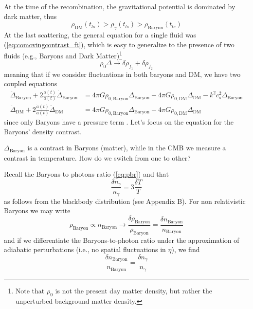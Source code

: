 At the time of the recombination, the gravitational potential is dominated by dark matter, thus
\begin{equation*}
    \rho_{\text{DM}}(t_{ls}) > \rho_{\gamma}(t_{ls}) > \rho_{\text{Baryon}}(t_{ls})
\end{equation*}
At the last scattering, the general equation for a single fluid was (\ref{eq:comovingcontrast_ft}), which is easy to generalize to the presence of two fluids (e.g., Baryons and Dark Matter)\footnote{Note that $\rho_{0}$ is not the present day matter density, but rather the unperturbed background matter density.}
\begin{equation*}
    \rho_{0}\Delta \to \delta\rho_{f_{1}}+\delta\rho_{f_{2}}
\end{equation*}
meaning that if we consider fluctuations in both baryons and DM, we have two coupled equations
\begin{align*}
    \ddot{\Delta}_{\text{Baryon}}+2\frac{\dot{a}(t)}{a(t)}\dot{\Delta}_{\text{Baryon}} &= 4\pi G\rho_{0,\text{Baryon}}\Delta_{\text{Baryon}}+4\pi G\rho_{0,\text{DM}}\Delta_{\text{DM}}-k^{2}c_{s}^{2}\Delta_{\text{Baryon}}\\
    \ddot{\Delta}_{\text{DM}}+2\frac{\dot{a}(t)}{a(t)}\dot{\Delta}_{\text{DM}} &= 4\pi G\rho_{0,\text{Baryon}}\Delta_{\text{Baryon}}+4\pi G\rho_{0,\text{DM}}\Delta_{\text{DM}}
\end{align*}
since only Baryons have a pressure term \cite{1993sfu..book.....P}. Let's focus on the equation for the Baryons' density contrast.
\par $\Delta_{\text{Baryon}}$ is a contrast in Baryons (matter), while in the CMB we measure a contrast in temperature. How do we switch from one to other?
\par Recall the Baryons to photons ratio (\ref{eq:pbr}) and that 
\begin{equation*}
    \frac{\delta n_{\gamma}}{n_{\gamma}} = 3\frac{\delta T}{T}
\end{equation*}
as follows from the blackbody distribution (see Appendix B). For non relativistic Baryons we may write 
$$\rho_{\text{Baryon}} \propto n_{\text{Baryon}} \to \frac{\delta\rho_{\text{Baryon}}}{\rho_{\text{Baryon}}} = \frac{\delta n_{\text{Baryon}}}{n_{\text{Baryon}}}$$
and if we differentiate the Baryons-to-photon ratio under the approximation of adiabatic perturbations (i.e., no spatial fluctuations in $\eta$), we find
\begin{equation*}
    \frac{\delta n_{\text{Baryon}}}{n_{\text{Baryon}}} = \frac{\delta n_{\gamma}}{n_{\gamma}}
\end{equation*}
